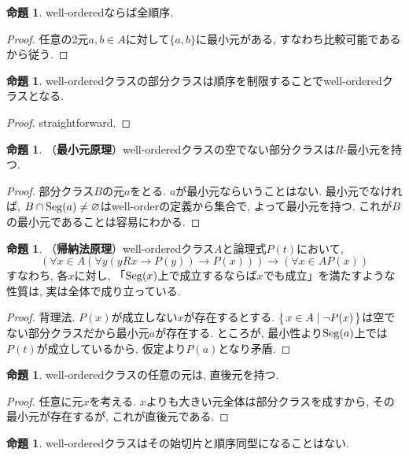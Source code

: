 \documentclass[a4paper, twoside]{bxjsarticle}
\theoremstyle{definition}
\newtheorem{prop}[thm]{命題}
\begin{document}
        \begin{prop}
            well-orderedならば全順序.
        \end{prop}
        \begin{proof}
            任意の2元$a, b\in A$に対して$\{a, b\}$に最小元がある, すなわち比較可能であるから従う.
        \end{proof}
        \begin{prop}
            well-orderedクラスの部分クラスは順序を制限することでwell-orderedクラスとなる.
        \end{prop}
        \begin{proof}
            straightforward.
        \end{proof}
        \begin{prop}
            （\textbf{最小元原理}）well-orderedクラスの空でない部分クラスは$R$-最小元を持つ.
        \end{prop}
        \begin{proof}
            部分クラス$B$の元$a$をとる. $a$が最小元ならいうことはない. 最小元でなければ, $B\cap{\rm Seg}(a)\neq\varnothing$はwell-orderの定義から集合で, よって最小元を持つ. これが$B$の最小元であることは容易にわかる. 
        \end{proof}
        \begin{prop}
            （\textbf{帰納法原理}）well-orderedクラス$A$と論理式$P(t)$において, \[(\forall x \in A (\forall y (yRx\to P(y))\to P(x)) )\to (\forall x\in A P(x))\]
            すなわち, 各$x$に対し, 「${\rm Seg}(x)$上で成立するならば$x$でも成立」を満たすような性質は, 実は全体で成り立っている.
        \end{prop}
        \begin{proof}
            背理法. $P(x)$が成立しない$x$が存在するとする. $\set{x\in A|\lnot P(x)}$は空でない部分クラスだから最小元$a$が存在する. ところが, 最小性より${\rm Seg}(a)$上では$P(t)$が成立しているから, 仮定より$P(a)$となり矛盾.
        \end{proof}
        \begin{prop}
            well-orderedクラスの任意の元は, 直後元を持つ.
        \end{prop}
        \begin{proof}
            任意に元$x$を考える. $x$よりも大きい元全体は部分クラスを成すから, その最小元が存在するが, これが直後元である.
        \end{proof}
        \begin{prop}
            well-orderedクラスはその始切片と順序同型になることはない.
        \end{prop}
\end{document}
